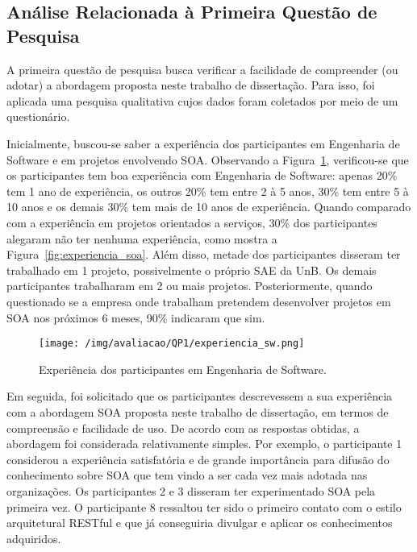 \subsection{Análise Relacionada à Primeira Questão de Pesquisa}

A primeira questão de pesquisa busca verificar a facilidade de compreender (ou adotar) a abordagem proposta neste trabalho de dissertação. Para isso, foi aplicada uma pesquisa qualitativa cujos dados foram coletados por meio de um questionário.

Inicialmente, buscou-se saber a experiência dos participantes em Engenharia de Software e em projetos envolvendo \acrshort{SOA}. Observando a Figura~\ref{fig:experiencia_sw}, verificou-se que os participantes tem boa experiência com Engenharia de Software: apenas 20\% tem 1 ano de experiência, os outros 20\% tem entre 2 à 5 anos, 30\% tem entre 5 à 10 anos e os demais 30\% tem mais de 10 anos de experiência. Quando comparado com a experiência em projetos orientados a serviços, 30\% dos participantes alegaram não ter nenhuma experiência, como mostra a Figura~\ref{fig:experiencia_soa}. Além disso, metade dos participantes disseram ter trabalhado em 1 projeto, possivelmente o próprio \acrshort{SAE} da UnB. Os demais participantes trabalharam em 2 ou mais projetos. Posteriormente, quando questionado se a empresa onde trabalham pretendem desenvolver projetos em \acrshort{SOA} nos próximos 6 meses, 90\% indicaram que sim.


\begin{figure}[htb]
\centering
\texttt{[image: /img/avaliacao/QP1/experiencia\_sw.png]}
\caption{Experiência dos participantes em Engenharia de Software.}
\label{fig:experiencia_sw}
\end{figure}
\FloatBarrier


Em seguida, foi solicitado que os participantes descrevessem a sua experiência com a abordagem \acrshort{SOA} proposta neste trabalho de dissertação, em termos de compreensão e facilidade de uso. De acordo com as respostas obtidas, a abordagem foi considerada relativamente simples. Por exemplo, o participante 1 considerou a experiência satisfatória e de grande importância para difusão do conhecimento sobre \acrshort{SOA} que tem vindo a ser cada vez mais adotada nas organizações. Os participantes 2 e 3 disseram ter experimentado \acrshort{SOA} pela primeira vez. O participante 8 ressaltou ter sido o primeiro contato com o estilo arquitetural RESTful e que já conseguiria divulgar e aplicar os conhecimentos adquiridos.


